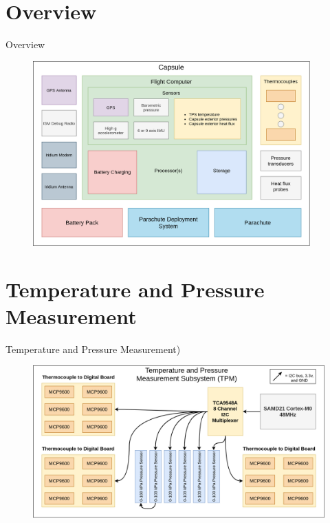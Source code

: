 \documentclass[UKenglish]{beamer}
\begin{document}
\section{Overview}
\begin{frame}{Overview}
	
	\begin{figure}
		\centering
		\includegraphics[width=0.95\textwidth]{images/amtps-avionics.png}
	\end{figure}
	
	
\end{frame}



\section{Temperature and Pressure Measurement}
\begin{frame}{Temperature and Pressure Measurement)}
	
	\begin{figure}[h!]
		\centering
		\includegraphics[width=\textwidth]{images/amtps-temp-pressure-subsystem.png}
	\end{figure}
	
\end{frame}
\end{document}
